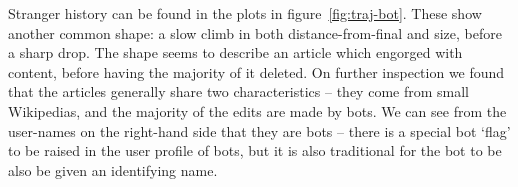 Stranger history can be found in the plots in
figure~\ref{fig:traj-bot}. These show another common shape: a slow
climb in both distance-from-final and size, before a sharp drop. The
shape seems to describe an article which engorged with content, before
having the majority of it deleted. On further inspection we found that
the articles generally share two characteristics -- they come from
small Wikipedias, and the majority of the edits are made by bots. We
can see from the user-names on the right-hand side that they are bots
-- there is a special bot `flag' to be raised in the user profile of
bots, but it is also traditional for the bot to be also be given an
identifying name.\cite{wiki-bot-policy}
 
\begin{figure}
  \centering
  \\
  \vspace{5mm}
\end{figure}
